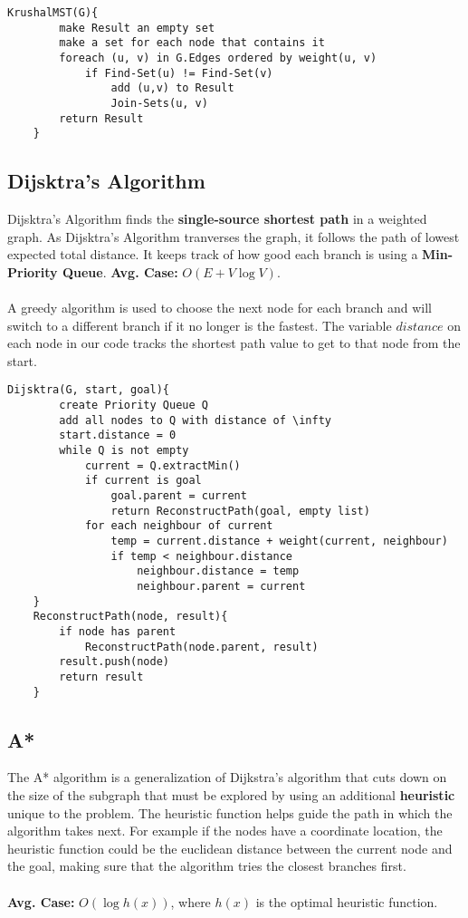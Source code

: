 \documentclass{article}
\begin{document}
	\begin{lstlisting}[style=pseudo]
	KrushalMST(G){
		make Result an empty set
		make a set for each node that contains it
		foreach (u, v) in G.Edges ordered by weight(u, v)
			if Find-Set(u) != Find-Set(v)
				add (u,v) to Result
				Join-Sets(u, v)
		return Result
	}
	\end{lstlisting}



	\subsection{Dijsktra's Algorithm}

	Dijsktra's Algorithm finds the {\bf single-source shortest path} in a weighted graph. As Dijsktra's Algorithm tranverses the graph, it follows the path of lowest expected total distance. It keeps track of how good each branch is using a {\bf Min-Priority Queue}. {\bf Avg. Case:} $O(E + V \log V)$.
	\\ \\
	A greedy algorithm is used to choose the next node for each branch and will switch to a different branch if it no longer is the fastest. The variable $distance$ on each node in our code tracks the shortest path value to get to that node from the start.

	\begin{lstlisting}[style=pseudo]
	Dijsktra(G, start, goal){
		create Priority Queue Q
		add all nodes to Q with distance of \infty
		start.distance = 0
		while Q is not empty
			current = Q.extractMin()
			if current is goal
				goal.parent = current
				return ReconstructPath(goal, empty list)
			for each neighbour of current
				temp = current.distance + weight(current, neighbour)
				if temp < neighbour.distance
					neighbour.distance = temp
					neighbour.parent = current
	}
	ReconstructPath(node, result){
		if node has parent
			ReconstructPath(node.parent, result)
		result.push(node)
		return result
	}
	\end{lstlisting}



	\subsection{A*}
	The A* algorithm is a generalization of Dijkstra's algorithm that cuts down on the size of the subgraph that must be explored by using an additional {\bf heuristic} unique to the problem. The heuristic function helps guide the path in which the algorithm takes next. For example if the nodes have a coordinate location, the heuristic function could be the euclidean distance between the current node and the goal, making sure that the algorithm tries the closest branches first.
	\\ \\
	{\bf Avg. Case:} $O(\log h(x))$, where $h(x)$ is the optimal heuristic function.
\end{document}
